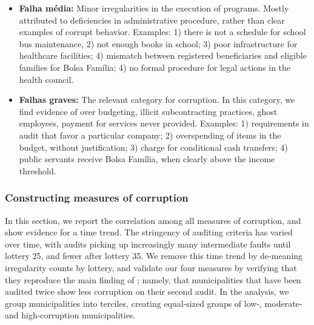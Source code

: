 \documentclass[12pt,a4paper]{article}
\theoremstyle{definition}
\begin{document}
{\begin{itemize}
    \item \textbf{Falha m\'{e}dia:} Minor irregularities in the execution of programs. Mostly attributed to deficiencies in administrative procedure, rather than clear examples of corrupt behavior. Examples: 1) there is not a schedule for school bus maintenance, 2) not enough books in school; 3) poor infrastructure for healthcare facilities; 4) mismatch between registered beneficiaries and eligible families for Bolsa Família; 4) no formal procedure for legal actions in the health council.
    \item \textbf{Falhas graves:} The relevant category for corruption. In this category, we find evidence of over budgeting, illicit subcontracting practices, ghost employees, payment for services never provided. Examples: 1) requirements in audit that favor a particular company; 2) overspending of items in the budget, without justification; 3) charge for conditional cash transfers; 4) public servants receive Bolsa Família, when clearly above the income threshold.
\end{itemize}

\subsubsection*{Constructing measures of corruption}

In this section, we report the correlation among all measures of corruption, and show evidence for a time trend. The stringency of auditing criteria has varied over time, with audits picking up increasingly many intermediate faults until lottery 25, and fewer after lottery 35. We remove this time trend by de-meaning irregularity counts by lottery, and validate our four measures by verifying that they reproduce the main finding of \citet{avis_government_2018}; namely, that municipalities that have been audited twice show less corruption on their second audit. In the analysis, we group municipalities into terciles, creating equal-sized groups of low-, moderate- and high-corruption municipalities. 

}
\end{document}
